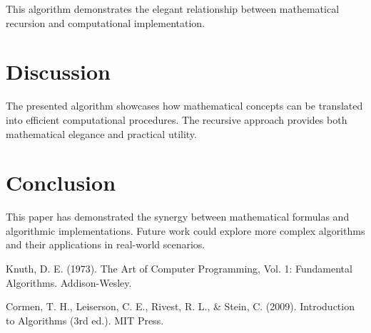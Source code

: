 \documentclass{article}
\begin{document}
This algorithm demonstrates the elegant relationship between mathematical recursion and computational implementation.

\section{Discussion}
The presented algorithm showcases how mathematical concepts can be translated into efficient computational procedures. The recursive approach provides both mathematical elegance and practical utility.

\section{Conclusion}
This paper has demonstrated the synergy between mathematical formulas and algorithmic implementations. Future work could explore more complex algorithms and their applications in real-world scenarios.


\begin{thebibliography}{9}
Knuth, D. E. (1973). The Art of Computer Programming, Vol. 1: Fundamental Algorithms. Addison-Wesley.

Cormen, T. H., Leiserson, C. E., Rivest, R. L., \& Stein, C. (2009). Introduction to Algorithms (3rd ed.). MIT Press.
\end{thebibliography}
\end{document}

